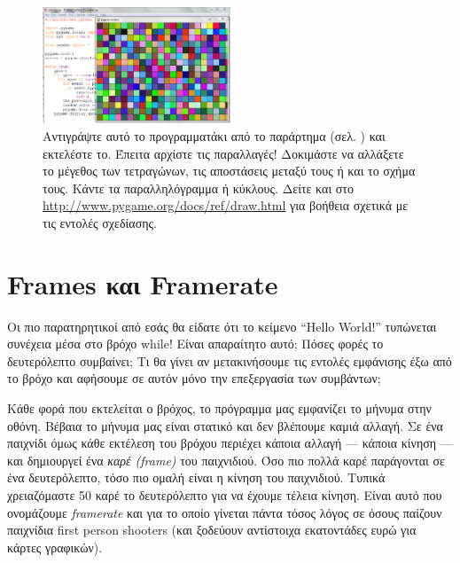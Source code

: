 \begin{figure}
  \centering
  \includegraphics[width=0.5\textwidth]{images/chapter4/colorbars}
  \caption[Πρόγραμμα colorbars]{Αντιγράψτε αυτό το προγραμματάκι από το παράρτημα (σελ. \pageref{listing:colorbars}) και εκτελέστε το. Έπειτα αρχίστε τις παραλλαγές! Δοκιμάστε να αλλάξετε το μέγεθος των τετραγώνων, τις αποστάσεις μεταξύ τους ή και το σχήμα τους. Κάντε τα παραλληλόγραμμα ή κύκλους. Δείτε και στο \url{http://www.pygame.org/docs/ref/draw.html}  για βοήθεια σχετικά με τις εντολές σχεδίασης.}
  \label{4-6}
\end{figure}

\section{Frames και Framerate}

Οι πιο παρατηρητικοί από εσάς θα είδατε ότι το κείμενο ``Hello World!'' τυπώνεται συνέχεια μέσα στο βρόχο while! Είναι απαραίτητο αυτό; Πόσες φορές το δευτερόλεπτο συμβαίνει; Τι θα γίνει αν μετακινήσουμε τις εντολές εμφάνισης έξω από το βρόχο και αφήσουμε σε αυτόν μόνο την επεξεργασία των συμβάντων;

Κάθε φορά που εκτελείται ο βρόχος, το πρόγραμμα μας εμφανίζει το μήνυμα στην οθόνη. Βέβαια το μήνυμα μας είναι στατικό και δεν βλέπουμε καμιά αλλαγή. Σε ένα παιχνίδι όμως κάθε εκτέλεση του βρόχου περιέχει κάποια αλλαγή --- κάποια κίνηση --- και δημιουργεί ένα {\em καρέ (frame)} του παιχνιδιού. Όσο πιο πολλά καρέ παράγονται σε ένα δευτερόλεπτο, τόσο πιο ομαλή είναι η κίνηση του παιχνιδιού. Τυπικά χρειαζόμαστε 50 καρέ το δευτερόλεπτο για να έχουμε τέλεια κίνηση.  Είναι αυτό που ονομάζουμε {\em framerate} και για το οποίο γίνεται πάντα τόσος λόγος σε όσους παίζουν παιχνίδια first person shooters (και ξοδεύουν αντίστοιχα εκατοντάδες ευρώ για κάρτες γραφικών).


